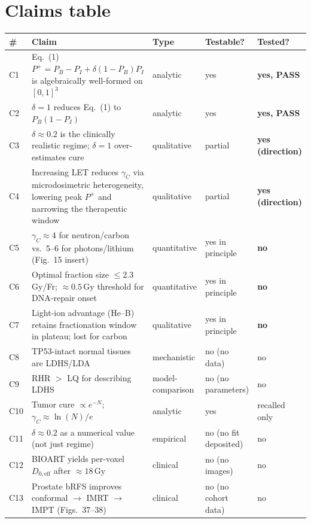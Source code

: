 \documentclass[11pt]{article}
\begin{document}
\section{Claims table}
\begin{longtable}{p{0.5cm}p{9cm}p{2.2cm}p{1.3cm}p{1.6cm}}
\toprule
\# & Claim & Type & Testable? & Tested? \\
\midrule
C1 & Eq.~(1) $P^{+}=P_B-P_I+\delta(1-P_B)P_I$ is algebraically well-formed
    on $[0,1]^3$ & analytic & yes & \textbf{yes, PASS} \\
C2 & $\delta = 1$ reduces Eq.~(1) to $P_B(1-P_I)$ & analytic & yes & \textbf{yes, PASS} \\
C3 & $\delta \approx 0.2$ is the clinically realistic regime; $\delta=1$
    over-estimates cure & qualitative & partial & \textbf{yes (direction)} \\
C4 & Increasing LET reduces $\gamma_C$ via microdosimetric heterogeneity,
    lowering peak $P^{+}$ and narrowing the therapeutic window & qualitative & partial & \textbf{yes (direction)} \\
C5 & $\gamma_C\!\approx\!4$ for neutron/carbon vs.\ 5--6 for photons/lithium
    (Fig.~15 insert) & quantitative & yes in principle & \textbf{no} \\
C6 & Optimal fraction size $\le 2.3$\,Gy/Fr; $\approx 0.5$\,Gy threshold
    for DNA-repair onset & quantitative & yes in principle & \textbf{no} \\
C7 & Light-ion advantage (He--B) retains fractionation window in plateau;
    lost for carbon & qualitative & yes in principle & \textbf{no} \\
C8 & TP53-intact normal tissues are LDHS/LDA & mechanistic & no (no data) & no \\
C9 & RHR $>$ LQ for describing LDHS & model-comparison & no (no parameters) & no \\
C10 & Tumor cure $\propto e^{-N}$; $\gamma_C \approx \ln(N)/e$ & analytic & yes & recalled only \\
C11 & $\delta \approx 0.2$ as a numerical value (not just regime) & empirical & no (no fit deposited) & no \\
C12 & BIOART yields per-voxel $D_{0,\text{eff}}$ after $\approx 18$\,Gy & clinical & no (no images) & no \\
C13 & Prostate bRFS improves conformal $\to$ IMRT $\to$ IMPT
    (Figs.~37--38) & clinical & no (no cohort data) & no \\
\bottomrule
\end{longtable}
\end{document}
